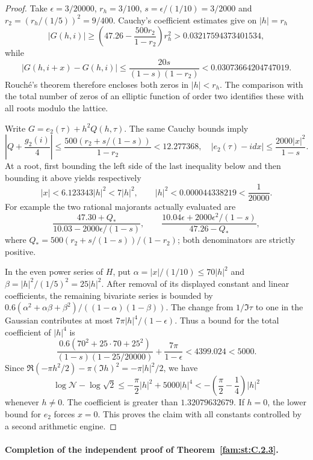 \begin{proof}
Take $\epsilon=3/20000$, $r_h=3/100$,
$s=\epsilon/(1/10)=3/2000$ and $r_2=(r_h/(1/5))^2=9/400$.
Cauchy's coefficient estimates give on $|h|=r_h$
\[
 |G(h,i)|\geq
 \left(47.26-\frac{500r_2}{1-r_2}\right)r_h^2
       >0.03217594373401534,
\]
while
\[
 |G(h,i+x)-G(h,i)|\leq
 \frac{20s}{(1-s)(1-r_2)}<0.03073664204747019.
\]
Rouch\'e's theorem therefore encloses both zeros in $|h|<r_h$.
The comparison with the total number of zeros of an elliptic function
of order two identifies these with all roots modulo the lattice.

Write $G=e_2(\tau)+h^2Q(h,\tau)$. The same Cauchy bounds imply
\[
 \left|Q+\frac{g_2(i)}4\right|
 \leq\frac{500(r_2+s/(1-s))}{1-r_2}<12.277368,
 \quad
 |e_2(\tau)-idx|\leq\frac{2000|x|^2}{1-s}.
\]
At a root, first bounding the left side of the last inequality below
and then bounding it above yields respectively
\[
 |x|<6.123343|h|^2<7|h|^2,
 \qquad |h|^2<0.000044338219<\frac1{20000}.
\]
For example the two rational majorants actually evaluated are
\[
 \frac{47.30+Q_*}{10.03-2000\epsilon/(1-s)},
 \qquad
 \frac{10.04\epsilon+2000\epsilon^2/(1-s)}{47.26-Q_*},
\]
where $Q_*=500(r_2+s/(1-s))/(1-r_2)$; both denominators are
strictly positive.

In the even power series of $H$, put
$\alpha=|x|/(1/10)\leq70|h|^2$ and
$\beta=|h|^2/(1/5)^2=25|h|^2$. After removal of its displayed
constant and linear coefficients, the remaining bivariate series is
bounded by
$0.6(\alpha^2+\alpha\beta+\beta^2)/((1-\alpha)(1-\beta))$.
The change from $1/\Im\tau$ to one in the Gaussian contributes
at most $7\pi|h|^4/(1-\epsilon)$. Thus a bound for the total
coefficient of $|h|^4$ is
\[
 \frac{0.6(70^2+25\cdot70+25^2)}
 {(1-s)(1-25/20000)}+\frac{7\pi}{1-\epsilon}
 <4399.024<5000.
\]
Since $\Re(-\pi h^2/2)-\pi(\Im h)^2=-\pi|h|^2/2$, we have
\[
 \log\mathcal N-\log\sqrt2
 \leq-\frac\pi2|h|^2+5000|h|^4
 <-\left(\frac\pi2-\frac14\right)|h|^2
\]
whenever $h\ne0$. The coefficient is greater than $1.32079632679$.
If $h=0$, the lower bound for $e_2$ forces $x=0$. This proves the
claim with all constants controlled by a second arithmetic engine.
\end{proof}

\paragraph{Completion of the independent proof of Theorem~\ref{fam:st:C.2.3}.}

